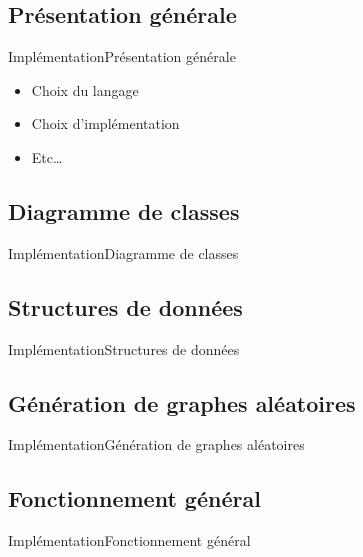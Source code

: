 \subsection{Présentation générale}
\begin{frame}{Implémentation}{Présentation générale}
\begin{itemize}
\item Choix du langage
\item Choix d'implémentation
\item Etc\ldots
\end{itemize}
\end{frame}

\subsection{Diagramme de classes}
\begin{frame}{Implémentation}{Diagramme de classes}
\end{frame}

\subsection{Structures de données}
\begin{frame}{Implémentation}{Structures de données}
\end{frame}

\subsection{Génération de graphes aléatoires}
\begin{frame}{Implémentation}{Génération de graphes aléatoires}
\end{frame}


\subsection{Fonctionnement général}
\begin{frame}{Implémentation}{Fonctionnement général}
\end{frame}